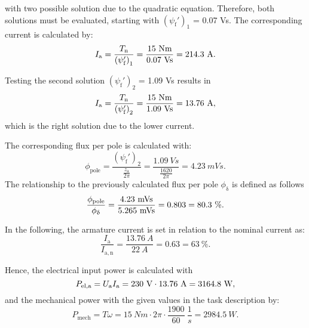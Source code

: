 \begin{solutionblock}
    with two possible solution due to the quadratic equation. Therefore, both solutions must be evaluated, starting with $\left(\psi_{\mathrm{f}}' \right)_{\mathrm{1}}$ = 0.07 Vs. The corresponding current is calculated by:
    \begin{equation}
        I_{\mathrm{a}} = \frac{\Tn}{\left(\psi_{\mathrm{f}}' \right)_{\mathrm{1}}}
        = \frac{15 \ \si{Nm}}{0.07 \ \si{Vs}}
        = 214.3 \ \si{A}.
    \end{equation}

    Testing the second solution $\left(\psi_{\mathrm{f}}' \right)_{\mathrm{2}}$ = 1.09 Vs results in
    \begin{equation}
        I_{\mathrm{a}} = \frac{\Tn}{\left(\psi_{\mathrm{f}}' \right)_{\mathrm{2}}}
        = \frac{15 \ \si{Nm}}{1.09 \ \si{Vs}}
        = 13.76 \ \si{A},
    \end{equation}
    which is the right solution due to the lower current.

    The corresponding flux per pole is calculated with:
    \begin{equation}
        \phi_{\mathrm{pole}} = \frac{\left(\psi_{\mathrm{f}}' \right)_2 }{\frac{z_{\mathrm{a}}}{2\pi}}
        = \frac{1.09 \ \si{Vs}}{\frac{1620}{2 \pi}}
        = 4.23 \ \si{mVs}.
    \end{equation}
    The relationship to the previously calculated flux per pole $\phi_{\updelta}$ is defined as follows
    \begin{equation}
        \frac{\phi_{\mathrm{pole}}}{\phiDelta}
        = \frac{4.23 \ \si{mVs}}{5.265 \ \si{mVs}}
        = 0.803
        = 80.3 \ \%.
    \end{equation}

    In the following, the armature current is set in relation to the nominal current as:
    \begin{equation}
        \frac{I_{\mathrm{a}}}{I_{\mathrm{a,n}}}
        = \frac{13.76 \ \si{A}}{22 \ \si{A}}
        = 0.63
        = 63 \ \%.
    \end{equation}

    Hence, the electrical input power is calculated with
    \begin{equation}
        P_{\mathrm{el,a}} = U_{\mathrm{a}} \Ia
        = 230 \ \si{V} \cdot 13.76 \ \si{A}
        = 3164.8 \ \si{W},
    \end{equation}
    and the mechanical power with the given values in the task description by:
    \begin{equation}
        P_{\mathrm{mech}} = T \omega
        = 15 \ \si{Nm} \cdot 2 \pi \cdot \frac{1900}{60} \ \si{\frac{1}{s}}
        = 2984.5 \ \si{W}.
    \end{equation}


\end{solutionblock}

